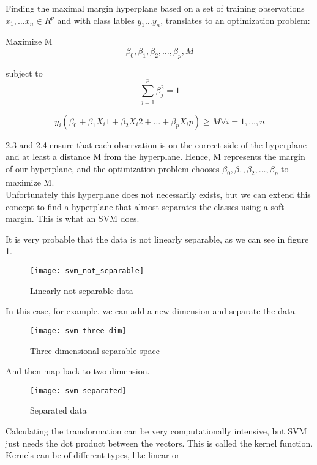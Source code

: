 Finding the maximal margin hyperplane based on a set of training observations $x_1, \dots x_n \in R^p$ and with class lables $y_1 \dots y_n$, translates to an optimization problem:

Maximize M
\begin{equation}
\beta_0, \beta_1, \beta_2, \dots, \beta_p, M
\end{equation}

subject to
\begin{equation}
\sum_{j=1}^{p}\beta^2_j = 1
\end{equation}

\begin{equation}
y_i(\beta_0 + \beta_1 X_i1 + \beta_2 X_i2 + \dots + \beta_p X_ip) \ge M \forall i = 1, \dots, n
\end{equation}

2.3 and 2.4 ensure that each observation is on the correct side of the hyperplane and at least a distance M from the hyperplane. Hence, M represents the margin of our hyperplane, and the optimization problem chooses $\beta_0, \beta_1, \beta_2, \dots, \beta_p$ to maximize M. \\
Unfortunately this hyperplane does not necessarily exists, but we can extend this concept to find a hyperplane that almost separates the classes using a soft margin. This is what an SVM does.

It is very probable that the data is not linearly separable, as we can see in figure \ref{fig:svmnotsep}.
\begin{figure}[H]
	\centering
	\texttt{[image: svm\_not\_separable]}
	\caption{Linearly not separable data \cite{svm_monkeylearn}}
	\label{fig:svmnotsep}
\end{figure}

In this case, for example, we can add a new dimension and separate the data. 
\begin{figure}[H]
	\centering
	\texttt{[image: svm\_three\_dim]}
	\caption{Three dimensional separable space \cite{svm_monkeylearn}}
\end{figure} 

And then map back to two dimension.
\begin{figure}[H]
	\centering
	\texttt{[image: svm\_separated]}
	\caption{Separated data \cite{svm_monkeylearn}}
\end{figure}



Calculating the transformation can be very computationally intensive, but SVM just needs the dot product between the vectors. This is called the kernel function. Kernels can be of different types, like linear or 
